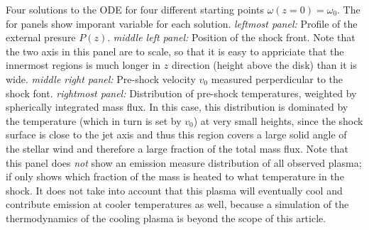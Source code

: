 \label{fig:omega_0}
Four solutions to the ODE for four different starting points $\omega(z=0)=\omega_0$. The for panels show imporant variable for each solution. \emph{leftmost panel:} Profile of the external presure $P(z)$. \emph{middle left panel:} Position of the shock front. Note that the two axis in this panel are to scale, so that it is easy to appriciate that the innermost regions is much longer in $z$ direction (height above the disk) than it is wide. \emph{middle right panel:} Pre-shock velocity $v_0$ measured perperdicular to the shock font. \emph{rightmost panel:} Distribution of pre-shock temperatures, weighted by spherically integrated mass flux. In this case, this distribution is dominated by the temperature (which in turn is set by $v_0$) at very small heights, since the shock surface is close to the jet axis and thus this region covers a large solid angle of the stellar wind and therefore a large fraction of the total mass flux. Note that this panel does \emph{not} show an emission measure distribution of all observed plasma; if only shows which fraction of the mass is heated to what temperature in the shock. It does not take into account that this plasma will eventually cool and contribute emission at cooler temperatures as well, because a simulation of the thermodynamics of the cooling plasma is beyond the scope of this article.